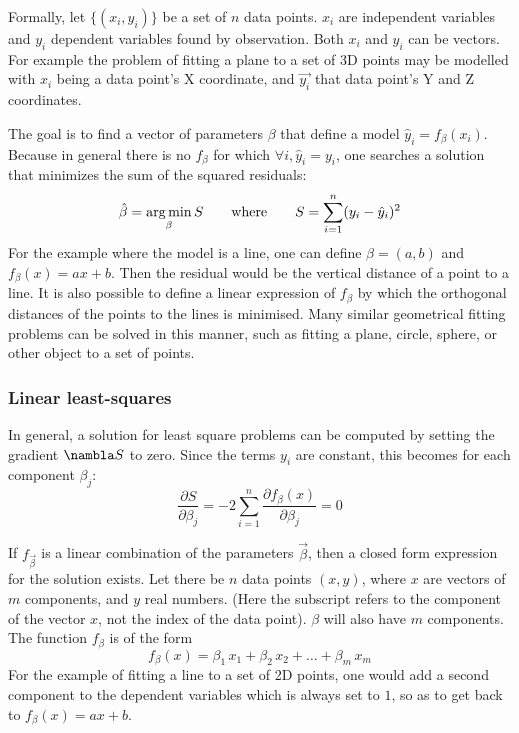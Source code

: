 Formally, let $\{ (x_i, y_i) \}$ be a set of $n$ data points. $x_i$ are independent variables and $y_i$ dependent variables found by observation. Both $x_i$ and $y_i$ can be vectors. For example the problem of fitting a plane to a set of 3D points may be modelled with $x_i$ being a data point's X coordinate, and $\vec{y_i}$ that data point's Y and Z coordinates.

The goal is to find a vector of parameters $\beta$ that define a model $\hat{y}_i = f_{\beta}(x_i)$. Because in general there is no $f_{\beta}$ for which $\forall i, \hat{y}_i = y_i$, one searches a solution that minimizes the sum of the squared residuals:
\begin{equation}
\hat{\beta} = \operatorname*{arg\,min}_{\beta} S \hspace{7mm} \text{where} \hspace{7mm} S = \sum_{i=1}^{n} (y_i - \hat{y}_i)^2
\end{equation}
For the example where the model is a line, one can define $\beta = (a, b)$ and $f_{\beta}(x) = ax + b$. Then the residual would be the vertical distance of a point to a line. It is also possible to define a linear expression of $f_{\beta}$ by which the orthogonal distances of the points to the lines is minimised. Many similar geometrical fitting problems can be solved in this manner, such as fitting a plane, circle, sphere, or other object to a set of points. \cite{Eber1999}

\subsubsection{Linear least-squares}
In general, a solution for least square problems can be computed by setting the gradient $\nambla S$ to zero. Since the terms $y_i$ are constant, this becomes for each component $\beta_j$:
\begin{equation} \label{eq:lsq_sol}
\frac{\partial S }{\partial \beta_j} = -2 \sum_{i=1}^{n} \frac{\partial f_{\beta}(x)}{\partial \beta_j} = 0
\end{equation}

If $f_{\vec{\beta}}$ is a linear combination of the parameters $\vec{\beta}$, then a closed form expression for the solution exists. Let there be $n$ data points $(x, y)$, where $x$ are vectors of $m$ components, and $y$ real numbers. (Here the subscript refers to the component of the vector $x$, not the index of the data point). $\beta$ will also have $m$ components. The function $f_{\beta}$ is of the form
\begin{equation} \label{eq:lsq_linf}
f_{\beta}(x) = \beta_1 \, x_1 + \beta_2 \, x_2 + \dots + \beta_m \, x_m
\end{equation}
For the example of fitting a line to a set of 2D points, one would add a second component to the dependent variables which is always set to $1$, so as to get back to $f_{\beta}(x) = ax + b$.

